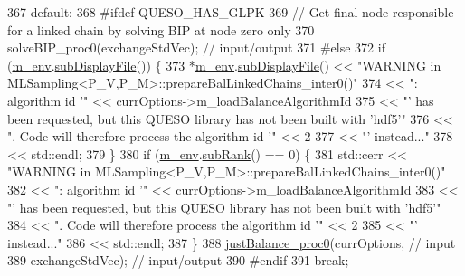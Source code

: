 \begin{DoxyCode}
367       \textcolor{keywordflow}{default}:
368 \textcolor{preprocessor}{#ifdef QUESO\_HAS\_GLPK}
369 \textcolor{preprocessor}{}        \textcolor{comment}{// Get final node responsible for a linked chain by solving BIP at node zero only}
370         solveBIP\_proc0(exchangeStdVec); \textcolor{comment}{// input/output}
371 \textcolor{preprocessor}{#else}
372 \textcolor{preprocessor}{}        \textcolor{keywordflow}{if} (\hyperlink{class_q_u_e_s_o_1_1_m_l_sampling_a13f1ca4fe9f94822fe572a743eaced1d}{m\_env}.\hyperlink{class_q_u_e_s_o_1_1_base_environment_a8a0064746ae8dddfece4229b9ad374d6}{subDisplayFile}()) \{
373           *\hyperlink{class_q_u_e_s_o_1_1_m_l_sampling_a13f1ca4fe9f94822fe572a743eaced1d}{m\_env}.\hyperlink{class_q_u_e_s_o_1_1_base_environment_a8a0064746ae8dddfece4229b9ad374d6}{subDisplayFile}() << \textcolor{stringliteral}{"WARNING in
       MLSampling<P\_V,P\_M>::prepareBalLinkedChains\_inter0()"}
374                                   << \textcolor{stringliteral}{": algorithm id '"} << currOptions->m\_loadBalanceAlgorithmId
375                                   << \textcolor{stringliteral}{"' has been requested, but this QUESO library has not been built with
       'hdf5'"}
376                                   << \textcolor{stringliteral}{". Code will therefore process the algorithm id '"} << 2
377                                   << \textcolor{stringliteral}{"' instead..."}
378                                   << std::endl;
379         \}
380         \textcolor{keywordflow}{if} (\hyperlink{class_q_u_e_s_o_1_1_m_l_sampling_a13f1ca4fe9f94822fe572a743eaced1d}{m\_env}.\hyperlink{class_q_u_e_s_o_1_1_base_environment_a172d52f993f1322ed45aaddf71518dbb}{subRank}() == 0) \{
381           std::cerr << \textcolor{stringliteral}{"WARNING in MLSampling<P\_V,P\_M>::prepareBalLinkedChains\_inter0()"}
382                     << \textcolor{stringliteral}{": algorithm id '"} << currOptions->m\_loadBalanceAlgorithmId
383                     << \textcolor{stringliteral}{"' has been requested, but this QUESO library has not been built with 'hdf5'"}
384                     << \textcolor{stringliteral}{". Code will therefore process the algorithm id '"} << 2
385                     << \textcolor{stringliteral}{"' instead..."}
386                     << std::endl;
387         \}
388         \hyperlink{class_q_u_e_s_o_1_1_m_l_sampling_a44ff302d505e5de781ea6635ea0d85d9}{justBalance\_proc0}(currOptions,     \textcolor{comment}{// input}
389                           exchangeStdVec); \textcolor{comment}{// input/output}
390 \textcolor{preprocessor}{#endif}
391 \textcolor{preprocessor}{}      \textcolor{keywordflow}{break};

\end{DoxyCode}
